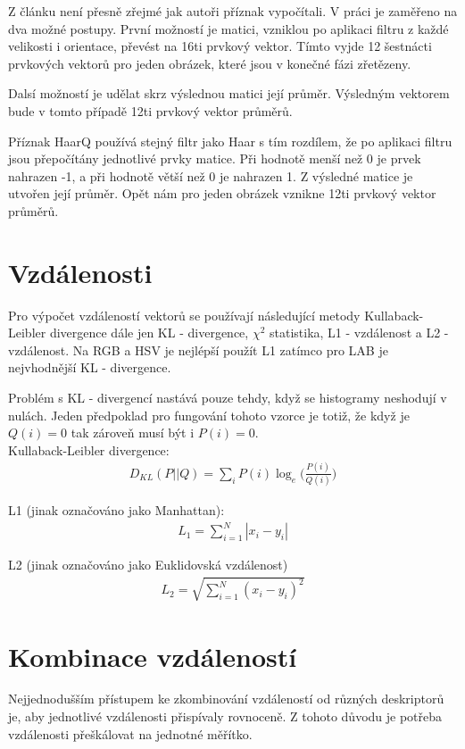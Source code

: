 \documentclass[czech,BP]{thesiskiv}
\begin{document}
\par Z článku \cite{JEC} není přesně zřejmé jak autoři příznak vypočítali. V práci je zaměřeno na dva možné postupy. První možností je matici, vzniklou po aplikaci filtru z každé velikosti i orientace, převést na 16ti prvkový vektor. Tímto vyjde 12 šestnácti prvkových vektorů pro jeden obrázek, které jsou v konečné fázi zřetězeny. 
\par Dalsí možností je udělat skrz výslednou matici její průměr. Výsledným vektorem bude v tomto případě 12ti prvkový vektor průměrů. 

\par Příznak HaarQ používá stejný filtr jako Haar s tím rozdílem, že po aplikaci filtru jsou přepočítány jednotlivé prvky matice. Při hodnotě menší než 0 je prvek nahrazen -1, a při hodnotě větší než 0 je nahrazen 1. Z výsledné matice je utvořen její průměr. Opět nám pro jeden obrázek vznikne 12ti prvkový vektor průměrů.   

\section{Vzdálenosti}
\par Pro výpočet vzdáleností vektorů se používají následující metody Kullaback-Leibler divergence dále jen KL - divergence, $\chi^2$ statistika, L1 - vzdálenost a L2 - vzdálenost. Na RGB a HSV je nejlépší použít L1 zatímco pro LAB je nejvhodnější KL - divergence. 

Problém s KL - divergencí nastává pouze tehdy, když se histogramy neshodují v nulách. Jeden předpoklad pro fungování tohoto vzorce je totiž, že když je $Q(i) = 0$ tak zároveň musí být i $P(i) = 0$. \\

Kullaback-Leibler divergence:
\begin{align}
   \label{kl}  D_{KL} (P || Q) = \sum_{i} P(i) \log_e \bigg({\frac{P(i)}{Q(i)}} \bigg) 
\end{align}

L1 (jinak označováno jako Manhattan):
\begin{align}
   \label{L1} L_1 = \sum_{i=1}^{N} |x_i - y_i|  
\end{align}

L2 (jinak označováno jako Euklidovská vzdálenost)
\begin{align}
   \label{L2} L_2 = \sqrt{\sum_{i=1}^{N} (x_i - y_i)^2}  
\end{align}
 
\section{Kombinace vzdáleností}
\par Nejjednodušším přístupem ke zkombinování vzdáleností od různých deskriptorů je, aby jednotlivé vzdálenosti přispívaly rovnoceně. Z tohoto důvodu je potřeba vzdálenosti přeškálovat na jednotné měřítko.
\end{document}
